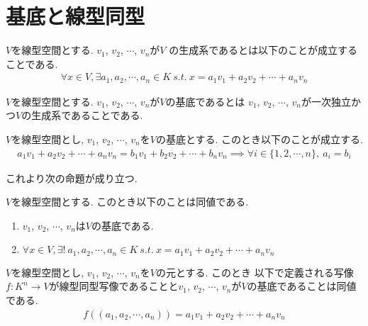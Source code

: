 \documentclass[11pt, a4paper, dvipdfmx]{jsarticle}
\theoremstyle{definition}
\newtheorem[S]{Def+}[Axiom+]{Definition}
\newtheorem[S]{Thm+}[Axiom+]{Theorem}
\newtheorem[S]{Prop+}[Axiom+]{Proposition}
\newtheorem[S]{Lemma+}[Axiom+]{Lemma}
\begin{document}
\section{基底と線型同型}
\begin{Def+}[生成系]
    $V$を線型空間とする. $v_{1}$, $v_{2}$, $\cdots$, $v_{n}$が$V$
    の生成系であるとは以下のことが成立することである.
    \begin{align*}
        \forall x\in V, \exists a_{1}, a_{2}, \cdots, a_{n}\in K~s.t.~ x = a_{1}v_{1} + a_{2}v_{2} + \cdots + a_{n}v_{n} 
    \end{align*}
\end{Def+}
\begin{Def+}[基底]
    $V$を線型空間とする. $v_{1}$, $v_{2}$, $\cdots$, $v_{n}$が$V$の基底であるとは
    $v_{1}$, $v_{2}$, $\cdots$, $v_{n}$が一次独立かつ$V$の生成系であることである.
\end{Def+}
\begin{Prop+}[基底の表現の一意性]
    $V$を線型空間とし, $v_{1}$, $v_{2}$, $\cdots$, $v_{n}$を$V$の基底とする. 
    このとき以下のことが成立する.
    \begin{align*}
        a_{1}v_{1} + a_{2}v_{2} + \cdots + a_{n}v_{n} = b_{1}v_{1} + b_{2}v_{2} + \cdots + b_{n}v_{n}  \implies \forall i\in\{1, 2, \cdots, n\},~ a_{i} =b_{i}
    \end{align*}
\end{Prop+}
    これより次の命題が成り立つ.
\begin{Prop+}[基底と生成系]
    $V$を線型空間とする. このとき以下のことは同値である.
    \begin{enumerate}
        \item $v_{1}$, $v_{2}$, $\cdots$, $v_{n}$は$V$の基底である.
        \item $\forall x\in V, \exists !~ a_{1}, a_{2}, \cdots, a_{n}\in K~s.t.~ x =  a_{1}v_{1} + a_{2}v_{2} + \cdots + a_{n}v_{n}$
    \end{enumerate}
\end{Prop+}
\begin{Thm+}
    $V$を線型空間とし, $v_{1}$, $v_{2}$, $\cdots$, $v_{n}$を$V$の元とする. このとき
    以下で定義される写像$f : K^{n}\to V$が線型同型写像であることと$v_{1}$, $v_{2}$, $\cdots$, $v_{n}$が$V$の基底であることは同値である.
    \begin{align*}
        f((a_{1}, a_{2}, \cdots, a_{n})) =  a_{1}v_{1} + a_{2}v_{2} + \cdots + a_{n}v_{n}
    \end{align*}
\end{Thm+}
\end{document}
